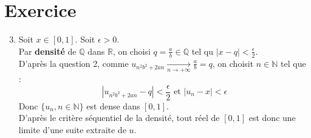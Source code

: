 \documentclass{report}
\begin{document}
\section{Exercice}
\begin{enumerate}
    \setcounter{enumi}{2}
    \item Soit $x \in [0, 1]$. Soit $\epsilon > 0$. \\
    Par \textbf{densité} de $\mathbb{Q}$ dans $\mathbb{R}$, on choisi $q = \frac{a}{b} \in \mathbb{Q}$ tel qu $|x-q|<\frac{\epsilon}{2}$. \\
    D'après la question 2, comme $u_{n^2 b^2 + 2an} \underset{n \to +\infty}{\longrightarrow} \frac{a}{b} = q$, on choisit $n \in \mathbb{N}$ tel que : 
    $$|u_{n^2b^2+2an} - q| < \frac{\epsilon}{2} \text{ et } |u_n - x| < \epsilon$$
    Donc $\{u_n, n\in \mathbb{N} \}$ est dense dans $[0,1]$. \\
    D'après le critère séquentiel de la densité, tout réel de $[0,1]$ est donc une limite d'une suite extraite de $u$. 
\end{enumerate}

\setcounter{section}{11}
\end{document}
